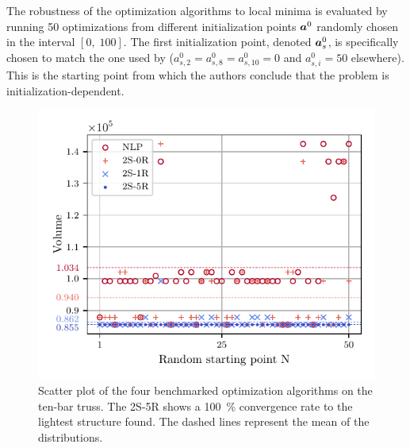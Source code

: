 The robustness of the optimization algorithms to local minima is evaluated by running 50 optimizations from different initialization points $\bm{a}^0$ randomly chosen in the interval $[0,\;100]$. The first initialization point, denoted $\bm{a}^0_s$, is specifically chosen to match the one used by \cite{stolpe_note_2003} ($a_{s,2}^0=a_{s,8}^0=a_{s,10}^0=0$ and $a_{s,i}^0=50$ elsewhere). This is the starting point from which the authors conclude that the problem is initialization-dependent. 

\begin{figure}
    \centering
    \includegraphics{figures/04_TTO_improvements/09_Convergence_10bars/10bar-conv.pdf}
    \caption{Scatter plot of the four benchmarked optimization algorithms on the ten-bar truss. The 2S-5R shows a \qty{100}{\%} convergence rate to the lightest structure found. The dashed lines represent the mean of the distributions.}
    \label{fig:04_10_bar_convergence}
\end{figure}

